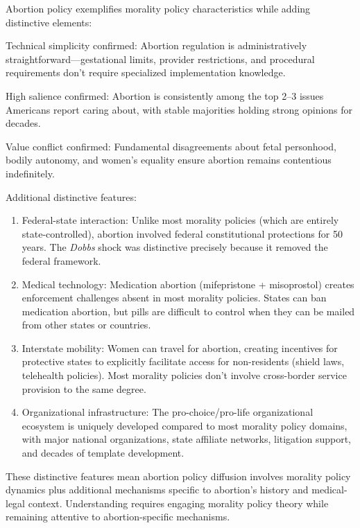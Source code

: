 Abortion policy exemplifies morality policy characteristics while adding distinctive elements:

Technical simplicity confirmed: Abortion regulation is administratively straightforward---gestational limits, provider restrictions, and procedural requirements don't require specialized implementation knowledge.

High salience confirmed: Abortion is consistently among the top 2--3 issues Americans report caring about, with stable majorities holding strong opinions for decades.

Value conflict confirmed: Fundamental disagreements about fetal personhood, bodily autonomy, and women's equality ensure abortion remains contentious indefinitely.

Additional distinctive features:

\begin{enumerate}
\item Federal-state interaction: Unlike most morality policies (which are entirely state-controlled), abortion involved federal constitutional protections for 50 years. The \emph{Dobbs} shock was distinctive precisely because it removed the federal framework.

\item Medical technology: Medication abortion (mifepristone + misoprostol) creates enforcement challenges absent in most morality policies. States can ban medication abortion, but pills are difficult to control when they can be mailed from other states or countries.

\item Interstate mobility: Women can travel for abortion, creating incentives for protective states to explicitly facilitate access for non-residents (shield laws, telehealth policies). Most morality policies don't involve cross-border service provision to the same degree.

\item Organizational infrastructure: The pro-choice/pro-life organizational ecosystem is uniquely developed compared to most morality policy domains, with major national organizations, state affiliate networks, litigation support, and decades of template development.
\end{enumerate}

These distinctive features mean abortion policy diffusion involves morality policy dynamics plus additional mechanisms specific to abortion's history and medical-legal context. Understanding requires engaging morality policy theory while remaining attentive to abortion-specific mechanisms.

